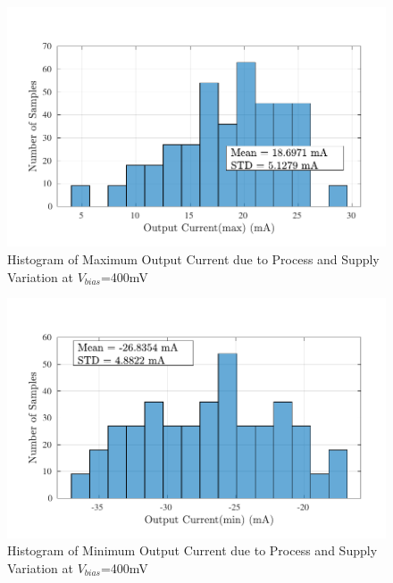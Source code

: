 \begin{figure} [H]
\centering
\includegraphics[scale=1]{Figures/Corners/Overall/PV_Mid/PDFs/PV_Mid_imax.pdf}
\caption{Histogram of Maximum Output Current due to Process and Supply Variation at $V_{bias}$=400mV}
\end{figure}

\begin{figure} [H]
\centering
\includegraphics[scale=1]{Figures/Corners/Overall/PV_Mid/PDFs/PV_Mid_imin.pdf}
\caption{Histogram of Minimum Output Current due to Process and Supply Variation at $V_{bias}$=400mV}
\end{figure}

